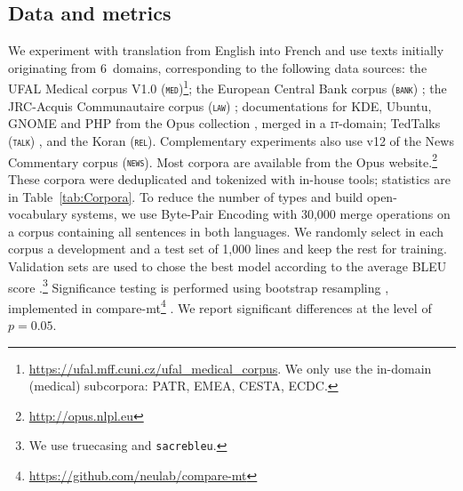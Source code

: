 \documentclass[11pt]{article}
\newcommand{\fyDone}[1]{\done[FY]\Todo[FY:]{\textcolor{orange}{#1}}}
\newcommand{\domain}[1]{\texttt{\textsc{#1}}}
\begin{document}
\subsection{Data and metrics \label{ssec:corpora}}
We experiment with translation from English into French and use texts initially originating from 6~domains, corresponding to the following data sources: the UFAL Medical corpus V1.0 (\domain{med})\footnote{\url{https://ufal.mff.cuni.cz/ufal_medical_corpus}. We only use the in-domain (medical) subcorpora: PATR, EMEA, CESTA, ECDC.}; the European Central Bank corpus (\domain{bank}) \citep{Tiedemann12parallel}; the JRC-Acquis Communautaire corpus (\domain{law}) \citep{Steinberger06acquis}; documentations for KDE, Ubuntu, GNOME and PHP from the Opus collection \citep{Tiedemann09news}, merged in a \domain{it}-domain; TedTalks (\domain{talk}) \citep{Cettolo12wit}, and the Koran (\domain{rel}). Complementary experiments also use v12 of the News Commentary corpus (\domain{news}). Most corpora are available from the Opus website.\footnote{\url{http://opus.nlpl.eu}} These corpora were deduplicated and tokenized with in-house tools; statistics are in Table~\ref{tab:Corpora}. To reduce the number of types and build open-vocabulary systems, we use Byte-Pair Encoding \citep{Sennrich16BPE} with 30,000 merge operations on a corpus containing all sentences in both languages.\fyDone{Add \# number of tokens, also specificity ?}%
%
We randomly select in each corpus a development and a test set of 1,000 lines and keep the rest for training. Validation sets are used to chose the best model according to the average BLEU score \citep{Papineni02bleu}.\footnote{We use truecasing and \texttt{sacrebleu}\citep{Post18call}.}\fyDone{A word about meta-parameter settings} Significance testing is performed using bootstrap resampling \citep{Koehn04statistical}, implemented in compare-mt\footnote{\url{https://github.com/neulab/compare-mt}} \citep{Neubig19compare-mt}. We report significant differences at the level of $p=0.05$.\fyDone{Fix correct p value}
\end{document}
